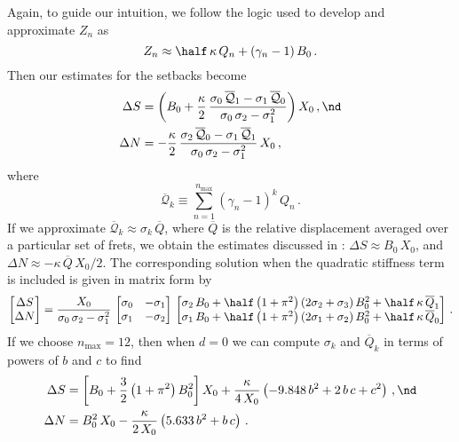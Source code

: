 Again, to guide our intuition, we follow the logic used to develop  and approximate $Z_n$ as
\begin{equation}
  Z_n \approx \half\, \kappa\, Q_n + \left(\gamma_n - 1\right) B_0\, .
\end{equation}
Then our estimates for the setbacks become
\begin{subequations}
  \begin{align}
    \Delta S &= \left(B_0 + \frac{\kappa}{2}\, \frac{\sigma_0\, \overline{\mathcal{Q}}_1 - \sigma_1\, \overline{\mathcal{Q}}_0}{\sigma_0\, \sigma_2 - \sigma_1^2} \right) X_0\, , \nd \\
    \Delta N &= -\frac{\kappa}{2}\, \frac{\sigma_2\, \overline{\mathcal{Q}}_0 - \sigma_1\, \overline{\mathcal{Q}}_1}{\sigma_0\, \sigma_2 - \sigma_1^2}\, X_0\, ,
  \end{align}
\end{subequations}
where
\begin{equation}
  \overline{\mathcal{Q}}_k \equiv \sum_{n = 1}^{n_\text{max}} \left(\gamma_n - 1\right)^k\, Q_n\, .
\end{equation}
If we approximate $\overline{\mathcal{Q}}_k \approx \sigma_k\, \overline{Q}$, where $\overline{Q}$ is the relative displacement averaged over a particular set of frets, we obtain the estimates discussed in : $\Delta S \approx B_0\, X_0$, and $\Delta N \approx -\kappa\, \overline{Q}\, X_0 / 2$. The corresponding solution when the quadratic stiffness term is included is given in matrix form by
\begin{equation}\label{eqn:rms_sol_quad}
\begin{bmatrix}
  \Delta S \\
  \Delta N
\end{bmatrix} = \frac{X_0}{\sigma_0\, \sigma_2 - \sigma_1^2}\,
\begin{bmatrix}
  \sigma_0 & -\sigma_1 \\
  \sigma_1 & -\sigma_2
\end{bmatrix}\,
\begin{bmatrix}
  \sigma_2\, B_0 + \half \left(1 + \pi^2\right) \left(2 \sigma_2 + \sigma_3\right) B_0^2 + \half\, \kappa\, \overline{Q}_1 \\
  \sigma_1\, B_0 + \half \left(1 + \pi^2\right) \left(2 \sigma_1 + \sigma_2\right) B_0^2 + \half\, \kappa\, \overline{Q}_0
\end{bmatrix}\, .
 \end{equation}
If we choose $n_\text{max} = 12$, then when $d = 0$ we can compute $\sigma_k$ and $\overline{Q}_k$ in terms of powers of $b$ and $c$ to find
\begin{align} \label{eqn:rms_sol_comp}
  \Delta S &= \left[ B_0 + \frac{3}{2} \left(1 + \pi^2\right) B_0^2 \right] X_0 + \frac{\kappa}{4\, X_0} \left( -9.848\, b^2 + 2\, b\, c + c^2 \right)\, , \nd \\
  \Delta N &= B_0^2\, X_0 - \frac{\kappa}{2\, X_0} \left( 5.633\, b^2 + b\, c \right)\, .
\end{align}


